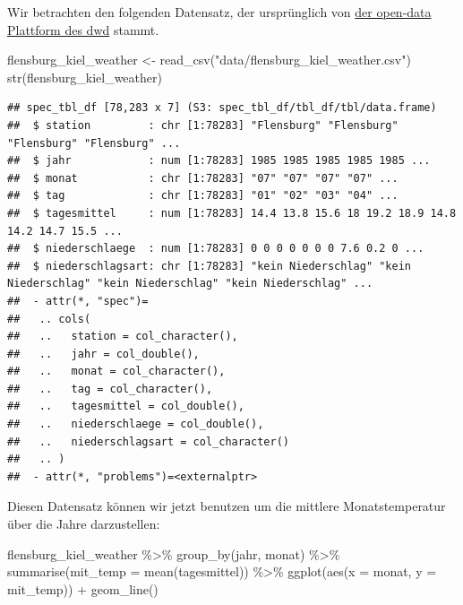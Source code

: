 \documentclass[
]{book}
\newenvironment{Shaded}{\begin{snugshade}}{\end{snugshade}}
\newcommand{\AttributeTok}[1]{\textcolor[rgb]{0.77,0.63,0.00}{#1}}
\newcommand{\FunctionTok}[1]{\textcolor[rgb]{0.00,0.00,0.00}{#1}}
\newcommand{\NormalTok}[1]{#1}
\newcommand{\OtherTok}[1]{\textcolor[rgb]{0.56,0.35,0.01}{#1}}
\newcommand{\SpecialCharTok}[1]{\textcolor[rgb]{0.00,0.00,0.00}{#1}}
\newcommand{\StringTok}[1]{\textcolor[rgb]{0.31,0.60,0.02}{#1}}
\begin{document}
Wir betrachten den folgenden Datensatz, der ursprünglich von \href{https://opendata.dwd.de/climate_environment/CDC/observations_germany/climate/daily/kl/historical/}{der open-data Plattform des dwd} stammt.

\begin{Shaded}
\begin{Highlighting}[]
\NormalTok{flensburg\_kiel\_weather }\OtherTok{\textless{}{-}} \FunctionTok{read\_csv}\NormalTok{(}\StringTok{"data/flensburg\_kiel\_weather.csv"}\NormalTok{)}
\FunctionTok{str}\NormalTok{(flensburg\_kiel\_weather)}
\end{Highlighting}
\end{Shaded}

\begin{verbatim}
## spec_tbl_df [78,283 x 7] (S3: spec_tbl_df/tbl_df/tbl/data.frame)
##  $ station         : chr [1:78283] "Flensburg" "Flensburg" "Flensburg" "Flensburg" ...
##  $ jahr            : num [1:78283] 1985 1985 1985 1985 1985 ...
##  $ monat           : chr [1:78283] "07" "07" "07" "07" ...
##  $ tag             : chr [1:78283] "01" "02" "03" "04" ...
##  $ tagesmittel     : num [1:78283] 14.4 13.8 15.6 18 19.2 18.9 14.8 14.2 14.7 15.5 ...
##  $ niederschlaege  : num [1:78283] 0 0 0 0 0 0 0 7.6 0.2 0 ...
##  $ niederschlagsart: chr [1:78283] "kein Niederschlag" "kein Niederschlag" "kein Niederschlag" "kein Niederschlag" ...
##  - attr(*, "spec")=
##   .. cols(
##   ..   station = col_character(),
##   ..   jahr = col_double(),
##   ..   monat = col_character(),
##   ..   tag = col_character(),
##   ..   tagesmittel = col_double(),
##   ..   niederschlaege = col_double(),
##   ..   niederschlagsart = col_character()
##   .. )
##  - attr(*, "problems")=<externalptr>
\end{verbatim}

Diesen Datensatz können wir jetzt benutzen um die mittlere Monatstemperatur über die Jahre darzustellen:

\begin{Shaded}
\begin{Highlighting}[]
\NormalTok{flensburg\_kiel\_weather }\SpecialCharTok{\%\textgreater{}\%} 
  \FunctionTok{group\_by}\NormalTok{(jahr, monat) }\SpecialCharTok{\%\textgreater{}\%} 
  \FunctionTok{summarise}\NormalTok{(}\AttributeTok{mit\_temp =} \FunctionTok{mean}\NormalTok{(tagesmittel)) }\SpecialCharTok{\%\textgreater{}\%} 
  \FunctionTok{ggplot}\NormalTok{(}\FunctionTok{aes}\NormalTok{(}\AttributeTok{x =}\NormalTok{ monat, }\AttributeTok{y =}\NormalTok{ mit\_temp)) }\SpecialCharTok{+}
  \FunctionTok{geom\_line}\NormalTok{()}
\end{Highlighting}
\end{Shaded}
\end{document}
